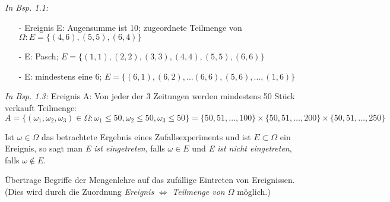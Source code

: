 \documentclass[a4paper,11pt]{article}
\begin{document}
\vspace{6pt}
\noindent\textit{In Bsp. 1.1:}
\begin{itemize}
    \item[-] Ereignis E: Augensumme ist 10; zugeordnete Teilmenge von $\Omega: E = \{(4,6),(5,5),(6,4)\}$
    \item[-] E: Pasch; $E = \{(1,1),(2,2),(3,3),(4,4),(5,5),(6,6)\}$
    \item[-] E: mindestens eine 6; $E = \{(6,1),(6,2),\dots(6,6),(5,6),\dots,(1,6)\}$
\end{itemize}

\vspace{6pt}
\noindent\textit{In Bsp. 1.3:}
\newline Ereignis A: Von jeder der 3 Zeitungen werden mindestens 50 Stück verkauft
\newline Teilmenge: $A = \{(\omega_1,\omega_2,\omega_3)\in\Omega:\omega_1\leq50,\omega_2\leq50,\omega_3\leq50\}=\{50,51,\dots,100\}\times\{50,51,\dots,200\}\times\{50,51,\dots,250\}$

\vspace{6pt}
\noindent Ist $\omega\in\Omega$ das betrachtete Ergebnis eines Zufallsexperiments und ist $E\subset\Omega$ ein Ereignis, so sagt man \textit{E ist eingetreten}, falls $\omega\in E$ und \textit{E ist nicht eingetreten}, falls $\omega\notin E$.

\noindent Übertrage Begriffe der Mengenlehre auf das zufällige Eintreten von Ereignissen. (Dies wird durch die Zuordnung \textit{Ereignis} $\Leftrightarrow$ \textit{Teilmenge von $\Omega$} möglich.)
\end{document}
